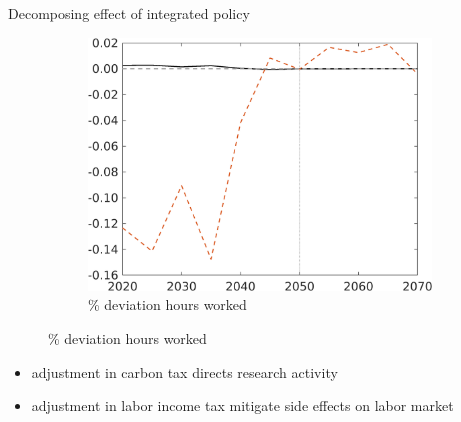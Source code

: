\documentclass[11pt,aspectratio=169]{beamer}
\begin{document}
\begin{frame}{Decomposing effect of integrated policy }
\begin{figure}
\begin{subfigure}{0.45\textwidth}
				\caption{{\% deviation hours worked }}
				\includegraphics[width=1\textwidth]{../codding_model/own_basedOnFried/optimalPol_010922_revision/figures/all_13Sept22/NewCalib_polTaulFixedTaufJointPer_Hagg_Sun2_emnet1_spillover0_knspil3_xgr0_nsk0_sep0_extern0_PV1_etaa0.79_lgd0.png}
			\end{subfigure}
		\end{figure}
		\vspace{3mm}
		\begin{block}{}
			\begin{itemize}
				\item adjustment in carbon tax directs research activity 
				\item adjustment in labor income tax mitigate side effects on labor market
			\end{itemize}
		\end{block}	
	\end{frame}
	
	
	\hypertarget{conc}{}
\end{document}

